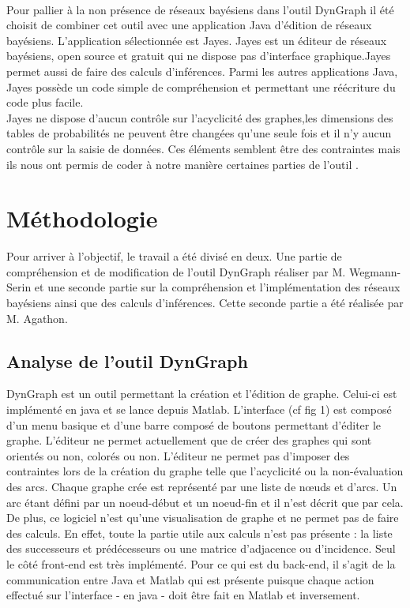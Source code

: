 \documentclass[conference]{IEEEtran}
\begin{document}
\\
Pour pallier à la non présence de réseaux bayésiens dans l'outil DynGraph il été choisit de combiner cet outil avec une application Java d'édition de réseaux bayésiens. L'application sélectionnée est Jayes. Jayes est un éditeur de réseaux bayésiens, open source et gratuit qui ne dispose pas d'interface graphique.Jayes permet aussi de faire des calculs d'inférences. Parmi les autres applications Java, Jayes possède un code simple de compréhension et permettant une réécriture du code plus facile. \\
Jayes ne dispose d'aucun contrôle sur l'acyclicité des graphes,les dimensions des tables de probabilités ne peuvent être changées qu'une seule fois et il n'y aucun contrôle sur la saisie de données. Ces éléments semblent être des contraintes mais ils nous ont permis de coder à notre manière certaines parties de l'outil .\\ 




\section{Méthodologie}

Pour arriver à l'objectif, le travail a été divisé en deux. Une partie de compréhension et de modification de l'outil DynGraph réaliser par M. Wegmann-Serin et une seconde partie sur la compréhension et l'implémentation des réseaux bayésiens ainsi que des calculs d'inférences. Cette seconde partie a été réalisée par M. Agathon. \\


\subsection{Analyse de l'outil DynGraph}

DynGraph est un outil permettant la création et l'édition de graphe. Celui-ci est implémenté en java et se lance depuis Matlab.
L'interface (cf fig 1) est composé d'un menu basique et d'une barre composé de boutons permettant d'éditer le graphe. L'éditeur ne permet actuellement que de créer des graphes qui sont orientés ou non, colorés ou non. L'éditeur ne permet pas d'imposer des contraintes lors de la création du graphe telle que l'acyclicité ou la non-évaluation des arcs. Chaque graphe crée est représenté par une liste de nœuds et d'arcs. Un arc étant défini par un noeud-début et un noeud-fin et il n'est décrit que par cela. De plus, ce logiciel n'est qu'une visualisation de graphe et ne permet pas de faire des calculs. En effet, toute la partie utile aux calculs n'est pas présente : la liste des successeurs et prédécesseurs ou une matrice d'adjacence ou d'incidence. Seul le côté front-end est très implémenté. Pour ce qui est du back-end, il s'agit de la communication entre Java et Matlab qui est présente puisque chaque action effectué sur l'interface - en java - doit être fait en Matlab et inversement. \\
\end{document}

